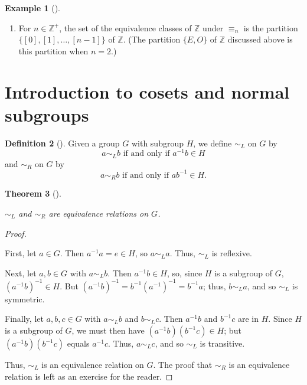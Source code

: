 \documentclass[10pt,]{book}
\theoremstyle{plain}
\newtheorem{theorem}{Theorem}[section]
\theoremstyle{definition}
\newtheorem{definition}[theorem]{Definition}
\theoremstyle{definition}
\theoremstyle{definition}
\newtheorem{example}[theorem]{Example}
\theoremstyle{definition}
\numberwithin{equation}{section}
\def\Z{\mathbb{Z}}
\def\siml{\sim_L}
\def\simr{\sim_R}
\begin{document}
\begin{example}[]\label{example-69}
\leavevmode%
\begin{enumerate}
\item\hypertarget{li-407}{}
            For \(n\in \Z^+\), the set of the equivalence classes of \(\Z\) under \(\equiv_n\) is
            the partition \(\{[0],[1],\ldots,[n-1]\}\) of \(\Z\). (The
            partition \(\{E
            ,O\}\) of \(\Z\) discussed above is this partition when
            \(n=2\).)
\end{enumerate}
\end{example}
\typeout{************************************************}
\typeout{************************************************}
\section[{Introduction to cosets and normal subgroups}]{Introduction to cosets and normal subgroups}\label{section-23}
\begin{definition}[{}]\label{definition-58}
 Given a group \(G\) with subgroup \(H\), we define
    \(\siml\) on \(G\) by  %
\begin{equation*}
a\siml b \text{ if and only if }
   a^{-1}b\in H
\end{equation*}
 and
    \(\simr\) on \(G\) by  %
\begin{equation*}
a\simr b \text{ if and only if }
   ab^{-1}\in H.
\end{equation*}
\label{notation-64}
\label{notation-65}
\end{definition}
\begin{theorem}[{}]\label{simlreq}

        \(\siml\) and \(\simr\) are equivalence relations on \(G\).
\end{theorem}
\begin{proof}\hypertarget{proof-37}{}

      First, let \(a\in G\). Then \(a^{-1}a=e\in H\),
      so \(a\siml a\). Thus, \(\siml\) is reflexive.
\par

      Next, let \(a,b\in G\) with \(a\siml b\). Then
      \(a^{-1}b\in H\), so, since \(H\) is a subgroup of \(G\),
      \((a^{-1}b)^{-1}\in H\). But
      \((a^{-1}b)^{-1}=b^{-1}(a^{-1})^{-1}=b^{-1}a\); thus, \(b\siml a\), and so \(\siml\) is symmetric.
\par

      Finally, let \(a,b,c\in G\) with \(a\siml b\)
      and \(b\siml c\). Then \(a^{-1}b\) and \(b^{-1}c\) are in \(H\). Since
      \(H\) is a subgroup of \(G\), we must then have
      \((a^{-1}b)(b^{-1}c)\in H\); but \((a^{-1}b)(b^{-1}c)\) equals
      \(a^{-1}c\). Thus, \(a\siml c\), and so \(\siml\) is transitive.
\par

      Thus, \(\siml\) is an equivalence relation on \(G\). The proof that \(\simr\) is an equivalence relation is left as an exercise for the reader.
\end{proof}
\end{document}

